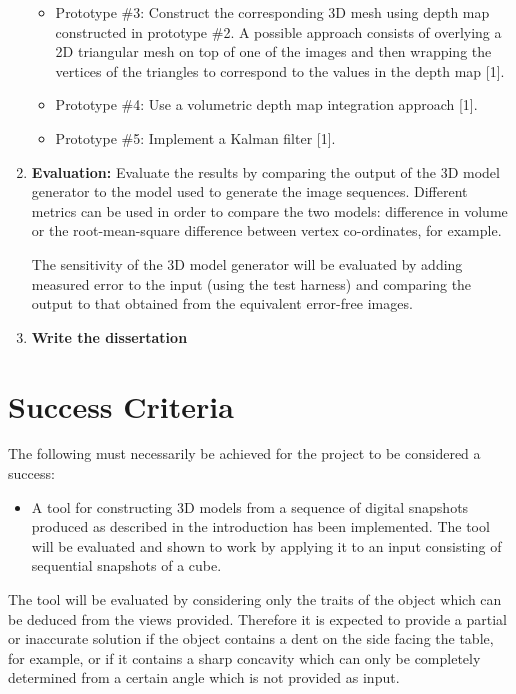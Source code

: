 \begin{enumerate}
\begin{itemize}
	\item Prototype \#{3}: Construct the corresponding 3D mesh using depth map constructed in prototype \#{2}. A possible approach consists of overlying a 2D triangular mesh on top of one of the images and then wrapping the vertices of the triangles to correspond to the values in the depth map [1].
	\item Prototype \#{4}: Use a volumetric depth map integration approach [1].
	\item Prototype \#{5}: Implement a Kalman filter [1].  
	\end{itemize}
\item {\bf Evaluation:} Evaluate the results by comparing the output of the 3D model generator to the model used to generate the image sequences. 
Different metrics can be used in order to compare the two models: difference in volume or the root-mean-square difference between vertex co-ordinates, for example.

The sensitivity of the 3D model generator will be evaluated by adding measured error to the input (using the test harness) and comparing the output to that obtained from the equivalent error-free images.  
\item {\bf Write the dissertation}     
\end{enumerate}

\section*{Success Criteria}
The following must necessarily be achieved for the project to be considered a success:
\begin{itemize}
\item A tool for constructing 3D models from a sequence of digital snapshots produced as described in the introduction has been implemented. The tool will be evaluated and shown to work by applying it to an input consisting of sequential snapshots of a cube. 
\end{itemize}
The tool will be evaluated by considering only the traits of the object which can be deduced from the views provided. Therefore it is expected to provide a partial or inaccurate solution if the object contains a dent on the side facing the table, for example, or if it contains a sharp concavity which can only be completely determined from a certain angle which is not provided as input.  

